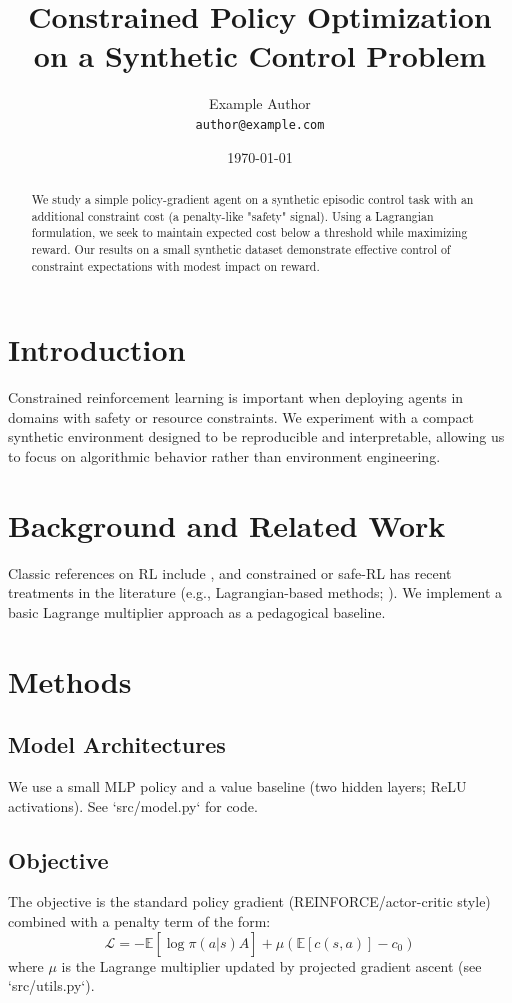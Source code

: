 \documentclass[11pt]{article}
\title{Constrained Policy Optimization on a Synthetic Control Problem}
\author{Example Author \\\texttt{author@example.com}}
\date{\today}
\begin{document}
\maketitle

\begin{abstract}
We study a simple policy-gradient agent on a synthetic episodic control task with an additional constraint cost (a penalty-like "safety" signal). Using a Lagrangian formulation, we seek to maintain expected cost below a threshold while maximizing reward. Our results on a small synthetic dataset demonstrate effective control of constraint expectations with modest impact on reward.
\end{abstract}

\section{Introduction}
Constrained reinforcement learning is important when deploying agents in domains with safety or resource constraints. We experiment with a compact synthetic environment designed to be reproducible and interpretable, allowing us to focus on algorithmic behavior rather than environment engineering.

\section{Background and Related Work}
Classic references on RL include \citet{Sutton2018}, and constrained or safe-RL has recent treatments in the literature (e.g., Lagrangian-based methods; \citet{Achiam2017}). We implement a basic Lagrange multiplier approach as a pedagogical baseline.

\section{Methods}
\subsection{Model Architectures}
We use a small MLP policy and a value baseline (two hidden layers; ReLU activations). See `src/model.py` for code.

\subsection{Objective}
The objective is the standard policy gradient (REINFORCE/actor-critic style) combined with a penalty term of the form:
\begin{equation}
\mathcal{L} = -\mathbb{E}[\log \pi(a|s) \hat{A}] + \mu ( \mathbb{E}[c(s,a)] - c_0 )
\end{equation}
where $\mu$ is the Lagrange multiplier updated by projected gradient ascent (see `src/utils.py`).
\end{document}
